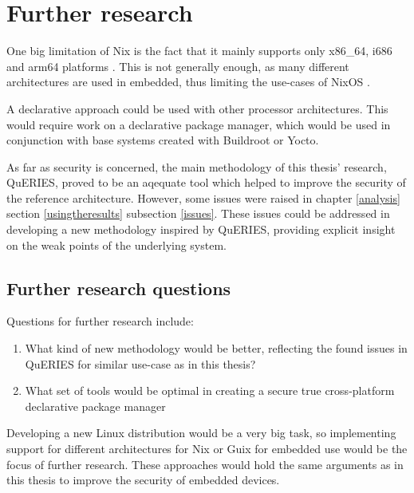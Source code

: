 \chapter{Further research} \label{further}

One big limitation of Nix is the fact that it mainly supports only
x86\_64, i686 and arm64 platforms \cite{nixosNixOSManual}. This is not
generally enough, as many different architectures are used in
embedded, thus limiting the use-cases of
NixOS \cite{fysarakis2014embedded}.

A declarative approach could be used with other processor
architectures. This would require work on a declarative package
manager, which would be used in conjunction with base systems created
with Buildroot or Yocto.

As far as security is concerned, the main methodology of this thesis'
research, QuERIES, proved to be an aqequate tool which helped to improve
the security of the reference architecture. However, some issues were
raised in chapter \ref{analysis} section \ref{usingtheresults}
subsection \ref{issues}. These issues could be addressed in developing
a new methodology inspired by QuERIES, providing explicit insight on
the weak points of the underlying system.

\section{Further research questions}

Questions for further research include:
\begin{enumerate}
  \item{What kind of new methodology would be better, reflecting
    the found issues in QuERIES for similar use-case as in this
    thesis?}
  \item What set of tools would be optimal in creating a secure true
    cross-platform declarative package manager 
    
\end{enumerate}

Developing a new Linux distribution would be a very big task, so
implementing support for different architectures for Nix or Guix for
embedded use would be the focus of further research. These approaches
would hold the same arguments as in this thesis to improve the
security of embedded devices.

